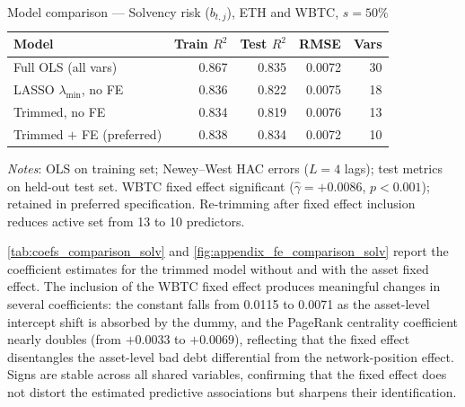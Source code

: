 \documentclass[a4paper,UKenglish,cleveref, autoref, thm-restate]{informs3}
\begin{document}
\FloatBarrier
\begin{table}[ht]
\centering
\begin{threeparttable}
\caption{Model comparison ---
         Solvency risk ($b_{t,j}$),
         ETH and WBTC, $s = 50\%$}
\label{tab:model_comparison_solv}
\begin{tabular}{lrrrr}
\toprule
Model
    & Train $R^2$
    & Test $R^2$
    & RMSE
    & Vars \\
\midrule
Full OLS (all vars)
    & 0.867 & 0.835 & 0.0072 & 30 \\
LASSO $\lambda_{\min}$, no FE
    & 0.836 & 0.822 & 0.0075 & 18 \\
Trimmed, no FE
    & 0.834 & 0.819 & 0.0076 & 13 \\
Trimmed $+$ FE (preferred)
    & 0.838 & 0.834 & 0.0072 & 10 \\
\bottomrule
\end{tabular}
\begin{tablenotes}[flushleft]
\setlength{\itemsep}{0pt}
\setlength{\parsep}{0pt}
\scriptsize
\item \textit{Notes}: OLS on training set; Newey--West HAC
errors ($L = 4$ lags); test metrics on held-out test set.
WBTC fixed effect significant ($\hat{\gamma} = +0.0086$,
$p < 0.001$); retained in preferred specification.
Re-trimming after fixed effect inclusion reduces active
set from 13 to 10 predictors.
\end{tablenotes}
\end{threeparttable}
\end{table}
\FloatBarrier
\autoref{tab:coefs_comparison_solv} and \autoref{fig:appendix_fe_comparison_solv} report the coefficient
estimates for the trimmed model without and with the asset fixed
effect. The inclusion of the WBTC fixed effect produces
meaningful changes in several coefficients: the constant falls
from 0.0115 to 0.0071 as the asset-level intercept shift is
absorbed by the dummy, and the PageRank centrality coefficient
nearly doubles (from $+0.0033$ to $+0.0069$), reflecting that
the fixed effect disentangles the asset-level bad debt
differential from the network-position effect. Signs are stable
across all shared variables, confirming that the fixed effect
does not distort the estimated predictive associations but
sharpens their identification.
\end{document}
